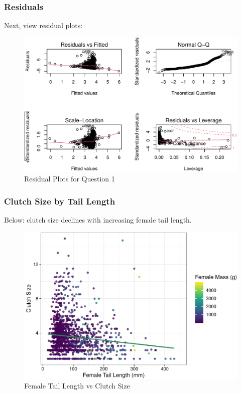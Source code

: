 \documentclass[
  12pt,
]{article}
\begin{document}
\hypertarget{residuals}{%
\subsubsection{Residuals}\label{residuals}}

Next, view residual plots:

\begin{figure}
\centering
\includegraphics{Project_Code_files/figure-latex/q-1_residuals-1.pdf}
\caption{Residual Plots for Question 1}
\end{figure}

\newpage

\hypertarget{clutch-size-by-tail-length}{%
\subsubsection{Clutch Size by Tail
Length}\label{clutch-size-by-tail-length}}

Below: clutch size declines with increasing female tail length.

\begin{figure}
\centering
\includegraphics{Project_Code_files/figure-latex/q-1_plot_main-1.pdf}
\caption{Female Tail Length vs Clutch Size}
\end{figure}
\end{document}
